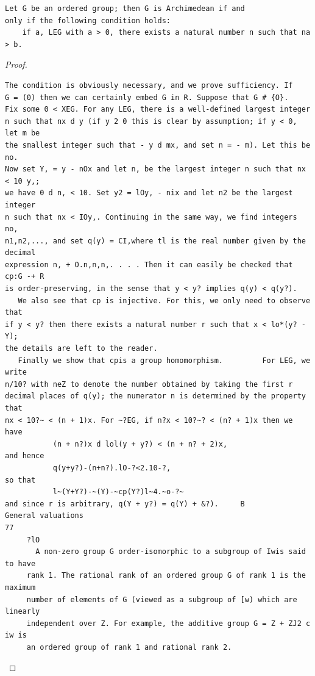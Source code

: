 \begin{theorem}\label{mcrt-auto-theorem-10-6}\uses{}
\begin{verbatim}
Let G be an ordered group; then G is Archimedean if and
only if the following condition holds:
    if a, LEG with a > 0, there exists a natural number n such that na > b.
\end{verbatim}
\end{theorem}
\begin{proof}
\begin{verbatim}
The condition is obviously necessary, and we prove sufficiency. If
G = (0) then we can certainly embed G in R. Suppose that G # {O}.
Fix some 0 < XEG. For any LEG, there is a well-defined largest integer
n such that nx d y (if y 2 0 this is clear by assumption; if y < 0, let m be
the smallest integer such that - y d mx, and set n = - m). Let this be no.
Now set Y, = y - nOx and let n, be the largest integer n such that nx < 10 y,;
we have 0 d n, < 10. Set y2 = lOy, - nix and let n2 be the largest integer
n such that nx < IOy,. Continuing in the same way, we find integers no,
n1,n2,..., and set q(y) = CI,where tl is the real number given by the decimal
expression n, + O.n,n,n,. . . . Then it can easily be checked that cp:G -+ R
is order-preserving, in the sense that y < y? implies q(y) < q(y?).
   We also see that cp is injective. For this, we only need to observe that
if y < y? then there exists a natural number r such that x < lo*(y? -Y);
the details are left to the reader.
   Finally we show that cpis a group homomorphism.         For LEG, we write
n/10? with neZ to denote the number obtained by taking the first r
decimal places of q(y); the numerator n is determined by the property that
nx < 10?~ < (n + 1)x. For ~?EG, if n?x < 10?~? < (n? + 1)x then we have
           (n + n?)x d lol(y + y?) < (n + n? + 2)x,
and hence
           q(y+y?)-(n+n?).lO-?<2.10-?,
so that
           l~(Y+Y?)-~(Y)-~cp(Y?)l~4.~o-?~
and since r is arbitrary, q(Y + y?) = q(Y) + &?).     B
General valuations                                                                      77
     ?lO
       A non-zero group G order-isomorphic to a subgroup of Iwis said to have
     rank 1. The rational rank of an ordered group G of rank 1 is the maximum
     number of elements of G (viewed as a subgroup of [w) which are linearly
     independent over Z. For example, the additive group G = Z + ZJ2 c iw is
     an ordered group of rank 1 and rational rank 2.
\end{verbatim}
\end{proof}


